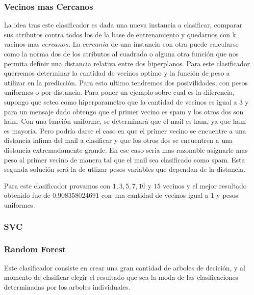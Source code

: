 \subsubsection{Vecinos mas Cercanos}

La idea tras este clasificador es dada una nueva instancia a clasificar, comparar sus atributos contra todos los de la base de entrenamiento y quedarnos con k vacinos mas $cercanos$. La $cercania$ de una instancia con otra puede calcularse como la norma dos de los atributos al cuadrado o alguna otra función que nos permita definir una distancia relativa entre dos hiperplanos. Para este clasificador querremos determinar la cantidad de vecinos optimo y la función de peso a utilizar en la predicción. Para esto ultimo tendremos dos posivilidades, con pesos uniformes o por distancia. Para poner un ejemplo sobre cual es la diferencia, supongo que seteo como hiperparametro que la cantidad de vecinos es igual a $3$ y para un mensaje dado obtengo que el primer vecino es spam y los otros dos son ham. Con una función uniforme, se determinará que el mail es ham, ya que ham es mayoría. Pero podría darse el caso en que el primer vecino se encuentre a una distancia infima del mail a clasificar y que los otros dos se encuentren a una distancia extremadamente grande. En ese caso sería mas razonable asignarle mas peso al primer vecino de manera tal que el mail sea clasificado como spam. Esta segunda solución será la de utlizar pesos variables que dependan de la distancia.

Para este clasificador provamos con $1,3,5,7,10$ y $15$ vecinos y el mejor resultado obtenido fue de $0.908358024691$ con una cantidad de vecinos igual a $1$ y pesos uniformes.


\subsubsection{SVC}


\subsubsection{Random Forest}

Este clasificador consiste en crear una gran cantidad de arboles de decición, y al momento de clasificar elegir el resultado que sea la moda de las clasificaciones determinadas por los arboles individuales.

